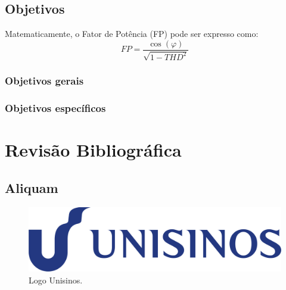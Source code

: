 \section{Objetivos}

Matematicamente, o Fator de Potência (FP) pode ser expresso como:
\begin{equation}
	\label{eq:k-55}
    {
    \displaystyle 
    FP = \frac{\cos(\varphi)}{\sqrt{1 - THD^2}}
    }
\end{equation}

\subsection{Objetivos gerais}

\subsection{Objetivos específicos}


\chapter{Revisão Bibliográfica}

\section{Aliquam}

\lipsum[2-3]

\begin{figure}[htp]
	\centering
	\caption{\label{fig:inrush-fig02} Logo Unisinos.}
	\includegraphics[width = 0.8\linewidth]{images/unisinos.png}
\end{figure}

